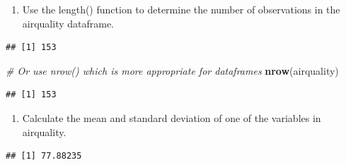 \documentclass[
]{article}
\newenvironment{Shaded}{\begin{snugshade}}{\end{snugshade}}
\newcommand{\CommentTok}[1]{\textcolor[rgb]{0.56,0.35,0.01}{\textit{#1}}}
\newcommand{\FunctionTok}[1]{\textcolor[rgb]{0.13,0.29,0.53}{\textbf{#1}}}
\newcommand{\NormalTok}[1]{#1}
\newcommand{\SpecialCharTok}[1]{\textcolor[rgb]{0.81,0.36,0.00}{\textbf{#1}}}
\providecommand{\tightlist}{%
  \setlength{\itemsep}{0pt}\setlength{\parskip}{0pt}}
\begin{document}
\begin{enumerate}
\def\labelenumi{\arabic{enumi}.}
\setcounter{enumi}{19}
\tightlist
\item
  Use the length() function to determine the number of observations in
  the airquality dataframe.
\end{enumerate}

\begin{Shaded}
\end{Shaded}

\begin{verbatim}
## [1] 153
\end{verbatim}

\begin{Shaded}
\begin{Highlighting}[]
\CommentTok{\# Or use nrow() which is more appropriate for dataframes}
\FunctionTok{nrow}\NormalTok{(airquality)}
\end{Highlighting}
\end{Shaded}

\begin{verbatim}
## [1] 153
\end{verbatim}

\begin{enumerate}
\def\labelenumi{\arabic{enumi}.}
\setcounter{enumi}{20}
\tightlist
\item
  Calculate the mean and standard deviation of one of the variables in
  airquality.
\end{enumerate}

\begin{Shaded}
\end{Shaded}

\begin{verbatim}
## [1] 77.88235
\end{verbatim}

\begin{Shaded}
\end{Shaded}
\end{document}
